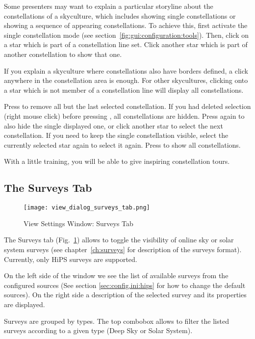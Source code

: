 Some presenters may want to explain a particular storyline about the
constellations of a skyculture, which includes showing single
constellations or showing a sequence of appearing constellations. To
achieve this, first activate the single constellation mode (see
section~\ref{fig:gui:configuration:tools}).  Then, click on a star
which is part of a constellation line set. Click
another star which is part of another constellation to show that one.

If you explain a skyculture where constellations also have borders
defined, a click anywhere in the constellation area is enough.  For
other skycultures, clicking onto a star which is not member of a
constellation line will display all constellations.

Press  to remove all but the last selected constellation.
If you had deleted selection (right mouse click) before pressing ,
all constellations are hidden.
Press  again to also hide the single displayed one, or click
another star to select the next constellation. If you need to keep the
single constellation visible, select the currently selected star again
to select it again.  Press  to show all constellations.

With a little training, you will be able to give inspiring
constellation tours.

\subsection{The Surveys Tab}
\label{sec:gui:view:surveys}

\begin{figure}[htbp]
\centering\texttt{[image: view\_dialog\_surveys\_tab.png]}
\caption{View Settings Window: Surveys Tab}
\label{fig:gui:view:surveys}
\end{figure}

The Surveys tab (Fig.~\ref{fig:gui:view:surveys}) allows to toggle the
visibility of online sky or solar system surveys (see chapter~\ref{ch:surveys}
for description of the surveys format).  Currently, only HiPS surveys are
supported.

On the left side of the window we see the list of available surveys from
the configured sources (See section \ref{sec:config.ini:hips} for how to
change the default sources).  On the right side a description of the selected
survey and its properties are displayed.

Surveys are grouped by types. The top combobox allows to filter the listed
surveys according to a given type (Deep Sky or Solar System).

